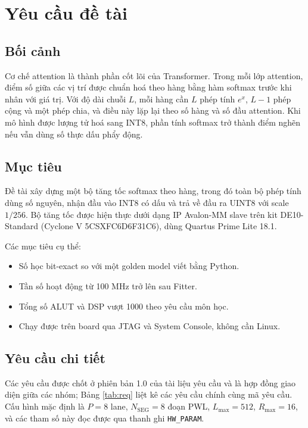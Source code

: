 \section{Yêu cầu đề tài}

\subsection{Bối cảnh}

Cơ chế attention là thành phần cốt lõi của Transformer. Trong mỗi lớp attention, điểm số giữa các vị trí được chuẩn hoá theo hàng bằng hàm softmax trước khi nhân với giá trị. Với độ dài chuỗi $L$, mỗi hàng cần $L$ phép tính $e^{x}$, $L-1$ phép cộng và một phép chia, và điều này lặp lại theo số hàng và số đầu attention. Khi mô hình được lượng tử hoá sang INT8, phần tính softmax trở thành điểm nghẽn nếu vẫn dùng số thực dấu phẩy động.

\subsection{Mục tiêu}

Đề tài xây dựng một bộ tăng tốc softmax theo hàng, trong đó toàn bộ phép tính dùng số nguyên, nhận đầu vào INT8 có dấu và trả về đầu ra UINT8 với scale $1/256$. Bộ tăng tốc được hiện thực dưới dạng IP Avalon-MM slave trên kit DE10-Standard (Cyclone V 5CSXFC6D6F31C6), dùng Quartus Prime Lite 18.1.

Các mục tiêu cụ thể:
\begin{itemize}
  \item Số học bit-exact so với một golden model viết bằng Python.
  \item Tần số hoạt động từ 100 MHz trở lên sau Fitter.
  \item Tổng số ALUT và DSP vượt 1000 theo yêu cầu môn học.
  \item Chạy được trên board qua JTAG và System Console, không cần Linux.
\end{itemize}

\subsection{Yêu cầu chi tiết}
\label{sec:req}

Các yêu cầu được chốt ở phiên bản 1.0 của tài liệu yêu cầu và là hợp đồng giao diện giữa các nhóm; Bảng \ref{tab:req} liệt kê các yêu cầu chính cùng mã yêu cầu. Cấu hình mặc định là $P = 8$ lane, $N_{\text{SEG}} = 8$ đoạn PWL, $L_{\max} = 512$, $R_{\max} = 16$, và các tham số này đọc được qua thanh ghi \texttt{HW\_PARAM}.

